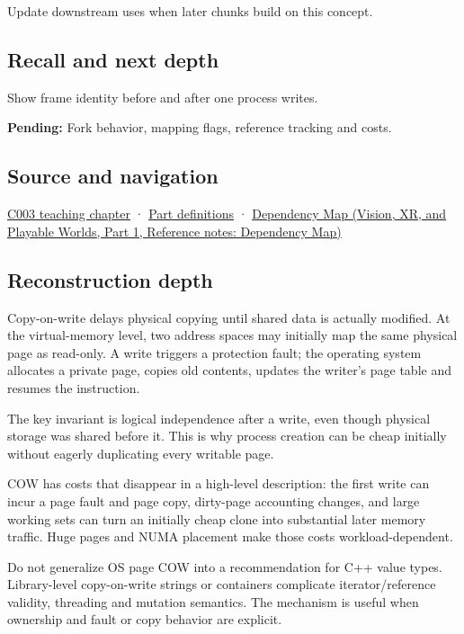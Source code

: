 Update downstream uses when later chunks build on this concept.

\subsection{Recall and next depth}\label{appendix-7a06e5baac04-recall-and-next-depth}

\hypertarget{appendix-7a06e5baac04-recall-and-next-depth}{}

Show frame identity before and after one process writes.

\textbf{Pending:} Fork behavior, mapping flags, reference tracking and costs.

\subsection{Source and navigation}\label{appendix-7a06e5baac04-source-and-navigation}

\hypertarget{appendix-7a06e5baac04-source-and-navigation}{}

\hyperref[01-foundations-i-ch002-where-the-bytes-live]{C003 teaching chapter} · \hyperref[appendix-fd090d982a15-m003---parts-41-60]{Part definitions} · \href{../07-Vision-XR-and-Playable-Worlds-P01/main.pdf\#nameddest=appendix-4ad47bdd269a}{Dependency Map (Vision, XR, and Playable Worlds, Part 1, Reference notes: Dependency Map)}

\subsection{Reconstruction depth}\label{appendix-7a06e5baac04-reconstruction-depth}

\hypertarget{appendix-7a06e5baac04-reconstruction-depth}{}

Copy-on-write delays physical copying until shared data is actually modified. At the virtual-memory level, two address spaces may initially map the same physical page as read-only. A write triggers a protection fault; the operating system allocates a private page, copies old contents, updates the writer's page table and resumes the instruction.

The key invariant is logical independence after a write, even though physical storage was shared before it. This is why process creation can be cheap initially without eagerly duplicating every writable page.

COW has costs that disappear in a high-level description: the first write can incur a page fault and page copy, dirty-page accounting changes, and large working sets can turn an initially cheap clone into substantial later memory traffic. Huge pages and NUMA placement make those costs workload-dependent.

Do not generalize OS page COW into a recommendation for C++ value types. Library-level copy-on-write strings or containers complicate iterator/reference validity, threading and mutation semantics. The mechanism is useful when ownership and fault or copy behavior are explicit.
